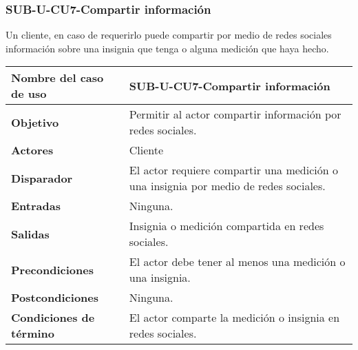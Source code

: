 \subsubsection{SUB-U-CU7-Compartir información}\label{SUB-U-CU7}
Un cliente, en caso de requerirlo puede compartir por medio de redes sociales información sobre una insignia que tenga o alguna medición que haya hecho.

\begin{longtable}{|J{5cm}|J{10.3cm}|}
	\hline
	\textbf{Nombre del caso de uso} &
		SUB-U-CU7-Compartir información \\ \hline
	\textbf{Objetivo} &
		Permitir al actor compartir información por redes sociales. \\ \hline
	\textbf{Actores} &
		Cliente \\ \hline 
	\textbf{Disparador} & 
		El actor requiere compartir una medición o una insignia por medio de redes sociales. \\ \hline 
	\textbf{Entradas} & Ninguna.
		\\ \hline 
	\textbf{Salidas} & Insignia o medición compartida en redes sociales.
		\\ \hline
	\textbf{Precondiciones} &
		El actor debe tener al menos una medición o una insignia.\\ \hline
	\textbf{Postcondiciones} & Ninguna.
		 \\ \hline
	\textbf{Condiciones de término} & El actor comparte la medición o insignia en redes sociales.

\end{longtable}
